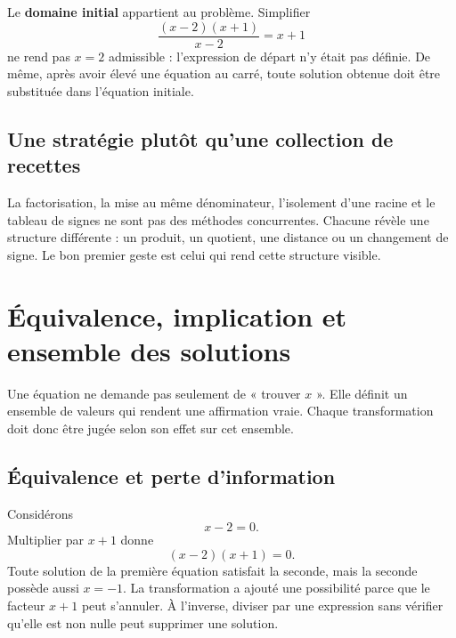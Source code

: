 \documentclass[12pt,a4paper,openany]{book}
\begin{document}
\begin{connectionbox}
Le \textbf{domaine initial} appartient au problème. Simplifier
\[
\frac{(x-2)(x+1)}{x-2}=x+1
\]
ne rend pas $x=2$ admissible : l'expression de départ n'y était pas définie. De même, après avoir élevé une équation au carré, toute solution obtenue doit être substituée dans l'équation initiale.
\end{connectionbox}

\subsection{Une stratégie plutôt qu'une collection de recettes}
La factorisation, la mise au même dénominateur, l'isolement d'une racine et le tableau de signes ne sont pas des méthodes concurrentes. Chacune révèle une structure différente : un produit, un quotient, une distance ou un changement de signe. Le bon premier geste est celui qui rend cette structure visible.


\section{Équivalence, implication et ensemble des solutions}

Une équation ne demande pas seulement de « trouver $x$ ». Elle définit un ensemble de valeurs qui rendent une affirmation vraie. Chaque transformation doit donc être jugée selon son effet sur cet ensemble.

\subsection{Équivalence et perte d'information}
Considérons
\[
x-2=0.
\]
Multiplier par $x+1$ donne
\[
(x-2)(x+1)=0.
\]
Toute solution de la première équation satisfait la seconde, mais la seconde possède aussi $x=-1$. La transformation a ajouté une possibilité parce que le facteur $x+1$ peut s'annuler. À l'inverse, diviser par une expression sans vérifier qu'elle est non nulle peut supprimer une solution.

\begin{center}
\end{center}
\end{document}
